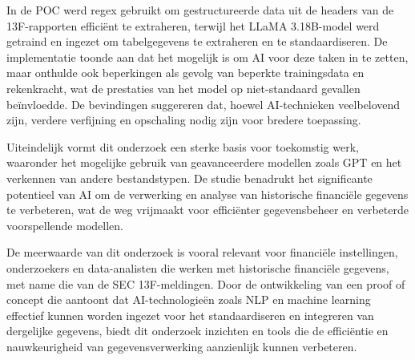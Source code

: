 In de POC werd regex gebruikt om gestructureerde data uit de headers van de 13F-rapporten efficiënt te extraheren, terwijl het LLaMA 3.18B-model werd getraind en ingezet om tabelgegevens te extraheren en te standaardiseren. De implementatie toonde aan dat het mogelijk is om AI voor deze taken in te zetten, maar onthulde ook beperkingen als gevolg van beperkte trainingsdata en rekenkracht, wat de prestaties van het model op niet-standaard gevallen beïnvloedde. De bevindingen suggereren dat, hoewel AI-technieken veelbelovend zijn, verdere verfijning en opschaling nodig zijn voor bredere toepassing.

Uiteindelijk vormt dit onderzoek een sterke basis voor toekomstig werk, waaronder het mogelijke gebruik van geavanceerdere modellen zoals GPT en het verkennen van andere bestandstypen. De studie benadrukt het significante potentieel van AI om de verwerking en analyse van historische financiële gegevens te verbeteren, wat de weg vrijmaakt voor efficiënter gegevensbeheer en verbeterde voorspellende modellen.

De meerwaarde van dit onderzoek is vooral relevant voor financiële instellingen, onderzoekers en data-analisten die werken met historische financiële gegevens, met name die van de SEC 13F-meldingen. Door de ontwikkeling van een proof of concept die aantoont dat AI-technologieën zoals NLP en machine learning effectief kunnen worden ingezet voor het standaardiseren en integreren van dergelijke gegevens, biedt dit onderzoek inzichten en tools die de efficiëntie en nauwkeurigheid van gegevensverwerking aanzienlijk kunnen verbeteren.